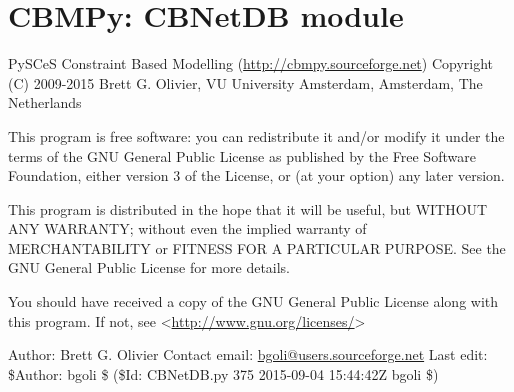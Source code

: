 \documentclass[a4paper,11pt,english]{sphinxmanual}
\begin{document}
\section{CBMPy: CBNetDB module}
\label{modules_doc:cbmpy-cbnetdb-module}
PySCeS Constraint Based Modelling (\href{http://cbmpy.sourceforge.net}{http://cbmpy.sourceforge.net})
Copyright (C) 2009-2015 Brett G. Olivier, VU University Amsterdam, Amsterdam, The Netherlands

This program is free software: you can redistribute it and/or modify
it under the terms of the GNU General Public License as published by
the Free Software Foundation, either version 3 of the License, or
(at your option) any later version.

This program is distributed in the hope that it will be useful,
but WITHOUT ANY WARRANTY; without even the implied warranty of
MERCHANTABILITY or FITNESS FOR A PARTICULAR PURPOSE.  See the
GNU General Public License for more details.

You should have received a copy of the GNU General Public License
along with this program.  If not, see \textless{}\href{http://www.gnu.org/licenses/}{http://www.gnu.org/licenses/}\textgreater{}

Author: Brett G. Olivier
Contact email: \href{mailto:bgoli@users.sourceforge.net}{bgoli@users.sourceforge.net}
Last edit: \$Author: bgoli \$ (\$Id: CBNetDB.py 375 2015-09-04 15:44:42Z bgoli \$)
\end{document}
